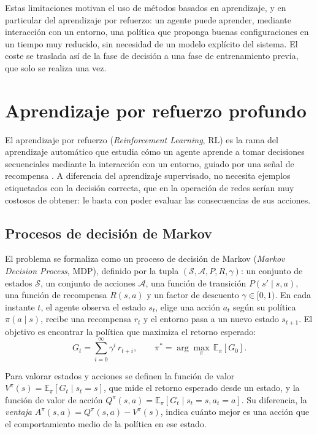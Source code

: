 Estas limitaciones motivan el uso de métodos basados en aprendizaje, y en particular del aprendizaje por refuerzo: un agente puede aprender, mediante interacción con un entorno, una política que proponga buenas configuraciones en un tiempo muy reducido, sin necesidad de un modelo explícito del sistema. El coste se traslada así de la fase de decisión a una fase de entrenamiento previa, que solo se realiza una vez.

\section{Aprendizaje por refuerzo profundo}\label{sec:drl}

El aprendizaje por refuerzo (\textit{Reinforcement Learning}, RL) es la rama del aprendizaje automático que estudia cómo un agente aprende a tomar decisiones secuenciales mediante la interacción con un entorno, guiado por una señal de recompensa \cite{sutton2018reinforcement}. A diferencia del aprendizaje supervisado, no necesita ejemplos etiquetados con la decisión correcta, que en la operación de redes serían muy costosos de obtener: le basta con poder evaluar las consecuencias de sus acciones.

\subsection{Procesos de decisión de Markov}

El problema se formaliza como un proceso de decisión de Markov (\textit{Markov Decision Process}, MDP), definido por la tupla $(\mathcal{S}, \mathcal{A}, P, R, \gamma)$: un conjunto de estados $\mathcal{S}$, un conjunto de acciones $\mathcal{A}$, una función de transición $P(s' \mid s, a)$, una función de recompensa $R(s,a)$ y un factor de descuento $\gamma \in [0,1)$. En cada instante $t$, el agente observa el estado $s_t$, elige una acción $a_t$ según su política $\pi(a \mid s)$, recibe una recompensa $r_t$ y el entorno pasa a un nuevo estado $s_{t+1}$. El objetivo es encontrar la política que maximiza el retorno esperado:
\begin{equation}\label{eq:retorno}
	G_t = \sum_{i=0}^{\infty} \gamma^{i}\, r_{t+i}, \qquad \pi^{*} = \arg\max_{\pi}\, \mathbb{E}_{\pi}\left[ G_0 \right].
\end{equation}

Para valorar estados y acciones se definen la función de valor $V^{\pi}(s) = \mathbb{E}_{\pi}[G_t \mid s_t = s]$, que mide el retorno esperado desde un estado, y la función de valor de acción $Q^{\pi}(s,a) = \mathbb{E}_{\pi}[G_t \mid s_t = s, a_t = a]$. Su diferencia, la \textit{ventaja} $A^{\pi}(s,a) = Q^{\pi}(s,a) - V^{\pi}(s)$, indica cuánto mejor es una acción que el comportamiento medio de la política en ese estado.

